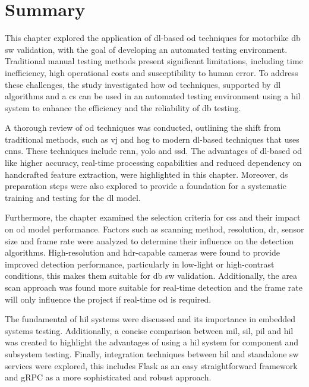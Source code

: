 \section{Summary}
This chapter explored the application of \gls{dl}-based \gls{od} techniques for motorbike \gls{db} \gls{sw} validation, with the goal of developing an automated testing environment. Traditional manual testing methods present significant limitations, including time inefficiency, high operational costs and susceptibility to human error. To address these challenges, the study investigated how \gls{od} techniques, supported by \gls{dl} algorithms and a \gls{cs} can be used in an automated testing environment using a \gls{hil} system to enhance the efficiency and the reliability of \gls{db} testing.

A thorough review of \gls{od} techniques was conducted, outlining the shift from traditional methods, such as \gls{vj} and \gls{hog} to modern \gls{dl}-based techniques that uses \gls{cnn}s. These techniques include \gls{rcnn}, \gls{yolo} and \gls{ssd}. The advantages of \gls{dl}-based \gls{od} like higher accuracy, real-time processing capabilities and reduced dependency on handcrafted feature extraction, were highlighted in this chapter. Moreover, \gls{ds} preparation steps were also explored to provide a foundation for a systematic training and testing for the \gls{dl} model.

Furthermore, the chapter examined the selection criteria for \gls{cs}s and their impact on \gls{od} model performance. Factors such as scanning method, resolution, \gls{dr}, sensor size and frame rate were analyzed to determine their influence on the detection algorithms. High-resolution and \gls{hdr}-capable cameras were found to provide improved detection performance, particularly in low-light or high-contrast conditions, this makes them suitable for \gls{db} \gls{sw} validation. Additionally, the area scan approach was found more suitable for real-time detection and the frame rate will only influence the project if real-time \gls{od} is required.

The fundamental of \gls{hil} systems were discussed and its importance in embedded systems testing. Additionally, a concise comparison between \gls{mil}, \gls{sil}, \gls{pil} and \gls{hil} was created to highlight the advantages of using a \gls{hil} system for component and subsystem testing. Finally, integration techniques between \gls{hil} and standalone \gls{sw} services were explored, this includes Flask as an easy straightforward framework and gRPC as a more sophisticated and robust approach.

